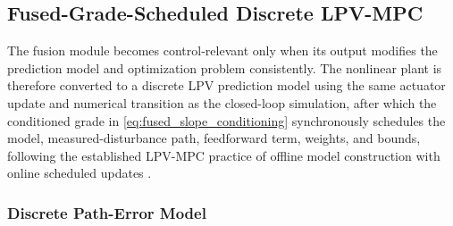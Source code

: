 \documentclass{ieeeaccess}
\newcommand{\citep}[1]{\cite{#1}}
\begin{document}
\subsection{Fused-Grade-Scheduled Discrete LPV-MPC}
\label{sec:model_lpv_mpc}

The fusion module becomes control-relevant only when its output modifies the prediction model and optimization problem consistently. The nonlinear plant is therefore converted to a discrete LPV prediction model using the same actuator update and numerical transition as the closed-loop simulation, after which the conditioned grade in \eqref{eq:fused_slope_conditioning} synchronously schedules the model, measured-disturbance path, feedforward term, weights, and bounds, following the established LPV-MPC practice of offline model construction with online scheduled updates \citep{Uchihori2021AUVLPVMPC}.

\subsubsection{Discrete Path-Error Model}
\end{document}
